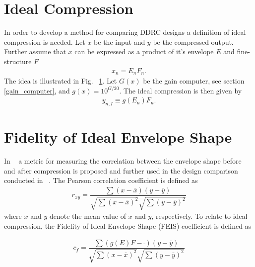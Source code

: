 \documentclass[../main2.tex]{subfiles}
\begin{document}
\section{Ideal Compression}
In order to develop a method for comparing DDRC designs a definition of ideal compression is needed. Let $x$ be the input and $y$ be the compressed output. Further assume that $x$ can be expressed as a product of it's envelope $E$ and fine-structure $F$ \begin{align}
x_n = E_nF_n.
\end{align}
The idea is illustrated in Fig. ~\ref{}. Let $G(x)$ be the gain computer, see section \ref{gain_computer}, and $g(x) = 10^{G/20}$. The ideal compression is then given by
\begin{align}
y_{n,I} \equiv g(E_n) F_n. 
\end{align}


\section{Fidelity of Ideal Envelope Shape} \label{fes}
In ~\cite{stone2007quantifying} a metric for measuring the correlation between the envelope shape before and after compression is proposed and further used in the design comparison conducted in ~\cite{reiss2012tutorial}. The Pearson correlation coefficient is defined as
\begin{align}
r_{xy} = \dfrac{\sum(x-\bar{x})(y-\bar{y})}{\sqrt{\sum(x-\bar{x})^2}\sqrt{\sum(y-\bar{y})^2}}
\end{align}
where $\bar{x}$ and $\bar{y}$ denote the mean value of $x$ and $y$, respectively. To relate to ideal compression, the Fidelity of Ideal Envelope Shape (FEIS) coefficient is defined as

\begin{align}
c_{f} = \dfrac{\sum(g(E)F-\bar{})(y-\bar{y})}{\sqrt{\sum(x-\bar{x})^2}\sqrt{\sum(y-\bar{y})^2}}
\end{align}
\end{document}
